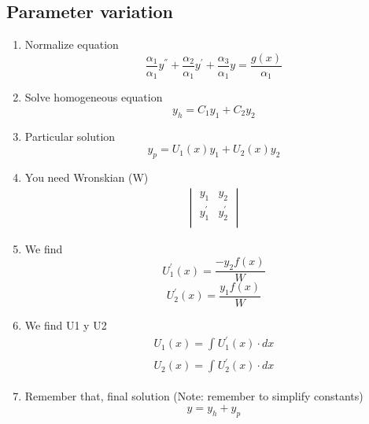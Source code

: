 \documentclass[letterpaper]{article}
\begin{document}
    \begin{multicols}{2}
        \section{Parameter variation}
        \begin{enumerate}
            \item Normalize equation
                \textbf {\[\frac{\alpha_{1}}{\alpha_{1}} y^{''} +  \frac{\alpha_{2}}{\alpha_{1}} y^{'}+ \frac{\alpha_{3}}{\alpha_{1}} y = \frac{g(x)}{\alpha_{1}} \]}
            \item Solve homogeneous equation 
                 \textbf {\[y_{h} = C_{1} y_1 + C_{2} y_2\]}  
            \item Particular solution
                \textbf {\[y_{p} = U_{1}(x) y_1 + U_{2}(x) y_2\]}
            \item You need Wronskian (W)
                \textbf{
                    \begin{gather*}
                        \begin{vmatrix}
                            y_{1} & y_{2}\\
                            y_{1} ^{'} & y_{2} ^ {'}\\
                        \end{vmatrix}
                    \end{gather*}
                }
            \item We find
                 \textbf {\[U_{1}^{'}(x) = \frac{-y_2 f(x)}{W}\] \[U_{2}^{'}(x) = \frac{y_1 f(x)}{W}\]}
            \item We find U1 y U2
            \textbf{
                \begin{gather*}
                U_{1}(x) = \int_{}^{} U_{1}^{'}(x) \cdot dx 
                \end{gather*}
                \begin{gather*}
                U_{2}(x) = \int_{}^{} U_{2}^{'}(x) \cdot dx 
                \end{gather*}
            }
            \item Remember that, final solution (Note: remember to simplify constants)
            \textbf{\[y = y_{h} + y_{p}\]}
        \end{enumerate}
    \end{multicols}
\end{document}
